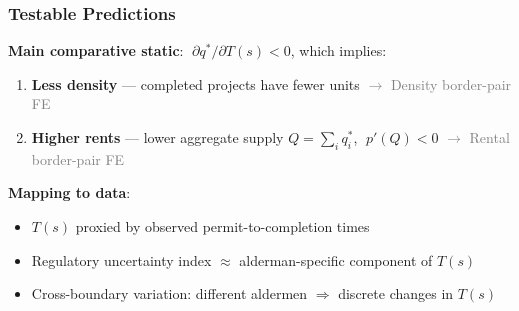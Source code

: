 \begin{frame}
	\frametitle{Testable Predictions}
	\small
	\textbf{Main comparative static}: $\;\partial q^* / \partial T(s) < 0$, which implies:
	\vspace{0.3em}
	\begin{enumerate}
		\item \textbf{Less density} --- completed projects have fewer units \hfill {\scriptsize\textcolor{gray}{$\rightarrow$ Density border-pair FE}}
		\item \textbf{Higher rents} --- lower aggregate supply $Q = \sum_i q_i^{*}$, $\;p'(Q) < 0$ \hfill {\scriptsize\textcolor{gray}{$\rightarrow$ Rental border-pair FE}}
	\end{enumerate}

	\vspace{0.5em}
	\textbf{Mapping to data}:
	\begin{itemize}
		\item $T(s)$ proxied by observed permit-to-completion times
		\item Regulatory uncertainty index $\approx$ alderman-specific component of $T(s)$
		\item Cross-boundary variation: different aldermen $\Rightarrow$ discrete changes in $T(s)$
	\end{itemize}
\end{frame}
